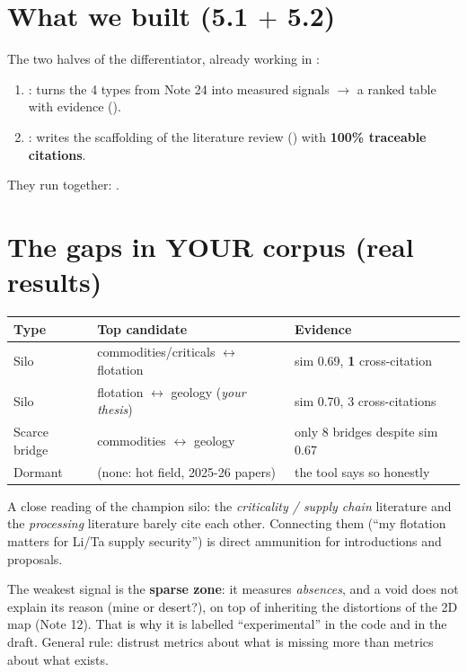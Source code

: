 \documentclass[11pt,a4paper]{article}
\begin{document}

\section{What we built (5.1 $+$ 5.2)}

The two halves of the differentiator, already working in :
\begin{enumerate}
  \item {}: turns the 4 types from Note 24 into measured signals
        $\rightarrow$ a ranked table with evidence
        ().
  \item {}: writes the scaffolding of the literature review
        () with \textbf{100\% traceable citations}.
\end{enumerate}
They run together: .

\section{The gaps in YOUR corpus (real results)}

\begin{center}
\begin{tabular}{lp{6.2cm}l}
\textbf{Type} & \textbf{Top candidate} & \textbf{Evidence} \\
\hline
Silo & commodities/criticals $\leftrightarrow$ flotation & sim 0.69, \textbf{1} cross-citation \\
Silo & flotation $\leftrightarrow$ geology (\emph{your thesis}) & sim 0.70, 3 cross-citations \\
Scarce bridge & commodities $\leftrightarrow$ geology & only 8 bridges despite sim 0.67 \\
Dormant & (none: hot field, 2025-26 papers) & the tool says so honestly \\
\end{tabular}
\end{center}

A close reading of the champion silo: the \emph{criticality / supply chain} literature and the
\emph{processing} literature barely cite each other. Connecting them (``my flotation matters
for Li/Ta supply security'') is direct ammunition for introductions and proposals.

\begin{ojo}
The weakest signal is the \textbf{sparse zone}: it measures \emph{absences}, and a void does
not explain its reason (mine or desert?), on top of inheriting the distortions of the 2D map
(Note 12). That is why it is labelled ``experimental'' in the code and in the draft. General
rule: distrust metrics about what is missing more than metrics about what exists.
\end{ojo}
\end{document}
